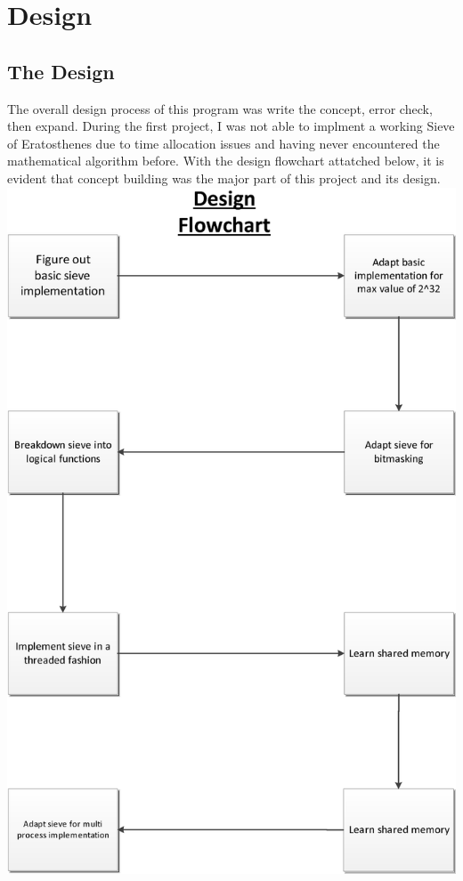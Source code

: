 \documentclass[letterpaper,10pt,titlepage]{article}
\begin{document}
\section{Design}
\label{System Design & Deviations}

\subsection{The Design}
\label{DesingProcess}
The overall design process of this program was write the concept, error check, then expand. During the first project, I was not able to implment a working Sieve of Eratosthenes due to time allocation issues and having never encountered the mathematical algorithm before. With the design flowchart attatched below, it is evident that concept building was the major part of this project and its design.
\includegraphics[height=\textheight]{DesignFlowchart.eps}
\end{document}
